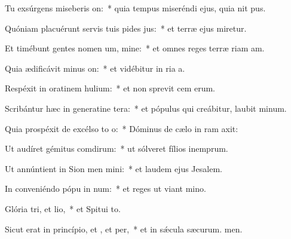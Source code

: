 \item Tu exsúrgens miseberis on:~* quia tempus miseréndi ejus, quia nit pus.
\item Quóniam placuérunt servis tuis pides jus:~* et terræ ejus miretur.
\item Et timébunt gentes nomen um, mine:~* et omnes reges terræ riam am.
\item Quia ædificávit minus on:~* et vidébitur in ria a.
\item Respéxit in oratinem hulium:~* et non sprevit cem erum.
\item Scribántur hæc in generatine tera:~* et pópulus qui creábitur, laubit minum.
\item Quia prospéxit de excélso to o:~* Dóminus de cælo in ram axit:
\item Ut audíret gémitus comdirum:~* ut sólveret fílios inemprum.
\item Ut annúntient in Sion men mini:~* et laudem ejus  Jesalem.
\item In conveniéndo pópu in num:~* et reges ut viant mino.
\item Glória tri, et lio,~* et Spitui to.
\item Sicut erat in princípio, et , et per,~* et in sǽcula sæcurum. men.
